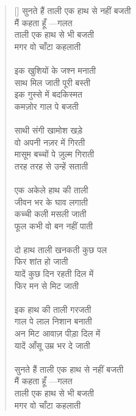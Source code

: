 \begin{verse}[\versewidth]\texthindi{
सुनते हैं ताली एक हाथ से नहीं बजती\\
मैं कहता हूँ —गलत\\
ताली एक हाथ से भी बजती\\
मगर वो चाँटा कहलाती\\
\\
इक खुशियों के जश्न मनाती\\
साथ मिल जाती पूरी बस्ती\\
इक गुस्से में बदकिस्मत\\
कमज़ोर गाल पे बजती\\
\\
साथी संगी खामोश खड़े\\
वो अपनी नज़र में गिरती\\
मासूम बच्चों पे ज़ुल्म गिराती\\
तरह तरह से उन्हें सताती\\
\\
एक अकेले हाथ की ताली\\
जीवन भर के घाव लगाती\\
कच्ची कली मसली जाती\\
फूल कभी वो बन नहीं पाती\\
\\
दो हाथ ताली खनकती कुछ पल\\
फिर शांत हो जाती \\
यादें कुछ दिन रहती दिल में \\
फिर मन से मिट जाती \\
\\
इक हाथ की ताली गरजती\\
गाल पे लाल निशान बनाती\\
अन मिट आवाज़ पीड़ा दिल में\\
यादें आँसू उम्र भर दे जाती\\
\\
सुनते हैं ताली एक हाथ से नहीं बजती\\
मैं कहता हूँ —गलत\\
ताली एक हाथ से भी बजती\\
मगर वो चाँटा कहलाती
}\end{verse}

